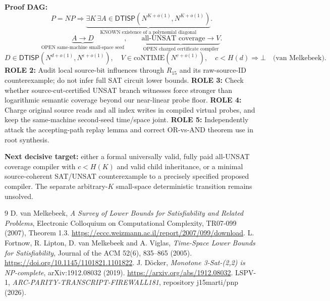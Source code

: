 \documentclass[11pt]{article}
\newcommand{\DTISP}{\mathsf{DTISP}}
\begin{document}
\noindent\textbf{Proof DAG:}
\[
 P=NP\Longrightarrow
 \underbrace{\exists K\,\exists A\in \DTISP(N^{K+o(1)},N^{K+o(1)})}_{\text{KNOWN existence of a polynomial diagonal}}.
\]
\[
 \underbrace{A\longrightarrow D}_{\text{OPEN same-machine small-space seed}},
 \qquad \underbrace{\text{all-UNSAT coverage}\longrightarrow V}_{\text{OPEN charged certificate compiler}}.
\]
\[
 D\in\DTISP(N^{d+o(1)},N^{\epsilon+o(1)}),
 \quad V\in\mathrm{coNTIME}(N^{c+o(1)}),\quad c<H(d)
 \Longrightarrow\boxed{\bot}\quad\text{(van Melkebeek)}.
\]
\noindent\textbf{ROLE 2:} Audit local source-bit influences through $R_{15}$ and its raw-source-ID counterexample; do not infer full SAT circuit lower bounds. \textbf{ROLE 3:} Check whether source-cut-certified UNSAT branch witnesses force stronger than logarithmic semantic coverage beyond our near-linear probe floor. \textbf{ROLE 4:} Charge original source reads and all index writes in compiled virtual probes, and keep the same-machine second-seed time/space joint. \textbf{ROLE 5:} Independently attack the accepting-path replay lemma and correct OR-vs-AND theorem use in root synthesis.

\noindent\textbf{Next decisive target:} either a formal universally valid, fully paid all-UNSAT coverage compiler with $c<H(K)$ and valid child inheritance, or a minimal source-coherent SAT/UNSAT counterexample to a precisely specified proposed compiler. The separate arbitrary-$K$ small-space deterministic transition remains unsolved.

\begin{thebibliography}{9}
 D. van Melkebeek, \emph{A Survey of Lower Bounds for Satisfiability and Related Problems}, Electronic Colloquium on Computational Complexity, TR07-099 (2007), Theorem 1.3. \url{https://eccc.weizmann.ac.il/report/2007/099/download}.
 L. Fortnow, R. Lipton, D. van Melkebeek and A. Viglas, \emph{Time-Space Lower Bounds for Satisfiability}, Journal of the ACM 52(6), 835--865 (2005). \url{https://doi.org/10.1145/1101821.1101822}.
 J. D\"ocker, \emph{Monotone 3-Sat-(2,2) is NP-complete}, arXiv:1912.08032 (2019). \url{https://arxiv.org/abs/1912.08032}.
 LSPV-1, \emph{ARC-PARITY-TRANSCRIPT-FIREWALL181}, repository j15marti/pnp (2026).
\end{thebibliography}
\end{document}
